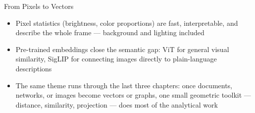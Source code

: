 \documentclass[8pt,aspectratio=169]{beamer}
\begin{document}
\begin{textframe}{From Pixels to Vectors}

\begin{itemize}
\item Pixel statistics (brightness, color proportions) are fast, interpretable, and describe the whole frame --- background and lighting included
\item Pre-trained embeddings close the semantic gap: ViT for general visual similarity, SigLIP for connecting images directly to plain-language descriptions
\item The same theme runs through the last three chapters: once documents, networks, or images become vectors or graphs, one small geometric toolkit --- distance, similarity, projection --- does most of the analytical work
\end{itemize}

\end{textframe}
\end{document}

